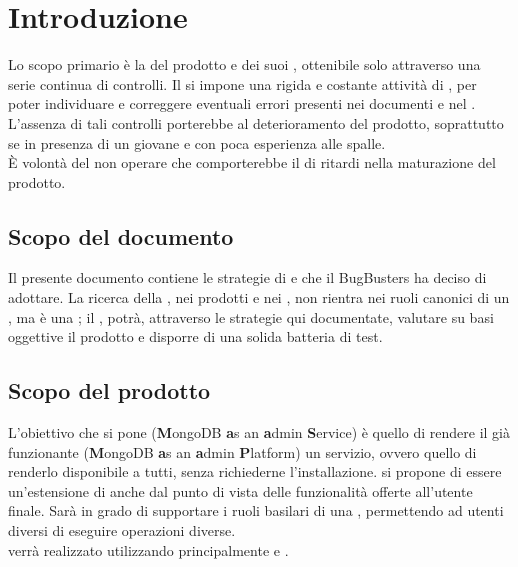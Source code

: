 \section{Introduzione}
Lo scopo primario è la  del prodotto e dei suoi , ottenibile solo attraverso una serie continua di controlli. Il  si impone una rigida e costante attività di , per poter individuare e correggere eventuali errori presenti nei documenti e nel . L'assenza di tali controlli porterebbe al deterioramento del prodotto, soprattutto se in presenza di un  giovane e con poca esperienza alle spalle. \\
È volontà del  non operare  che comporterebbe il  di ritardi nella maturazione del prodotto.

\subsection{Scopo del documento}
Il presente documento contiene le strategie di  e  che il  BugBusters ha deciso di adottare. La ricerca della , nei prodotti e nei , non rientra nei ruoli canonici di un , ma è una ; il , potrà, attraverso le strategie qui documentate, valutare su basi oggettive il prodotto e disporre di una solida batteria di test.

\subsection{Scopo del prodotto}
L'obiettivo che si pone  (\textbf{M}ongoDB \textbf{a}s an \textbf{a}dmin \textbf{S}ervice) è quello di rendere il già funzionante  (\textbf{M}ongoDB \textbf{a}s an \textbf{a}dmin \textbf{P}latform) un servizio, ovvero quello di renderlo disponibile a tutti, senza richiederne l'installazione.  si propone di essere un'estensione di  anche dal punto di vista delle funzionalità offerte all'utente finale. Sarà in grado di supportare i ruoli basilari di una , permettendo ad utenti diversi di eseguire operazioni diverse. \\
 verrà realizzato utilizzando principalmente  e .

